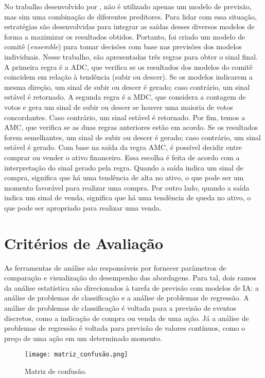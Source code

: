 No trabalho desenvolvido por , não é utilizado apenas um modelo de previsão, mas sim uma combinação de diferentes preditores. Para lidar com essa situação, estratégias são desenvolvidas para integrar as saídas desses diversos modelos de forma a maximizar os resultados obtidos. Portanto, foi criado um modelo de comitê (\textit{ensemble}) para tomar decisões com base nas previsões dos modelos individuais. Nesse trabalho, são apresentadas três regras para obter o sinal final. A primeira regra é a \ac{ADC}, que verifica se os resultados dos modelos do comitê coincidem em relação à tendência (subir ou descer). Se os modelos indicarem a mesma direção, um sinal de subir ou descer é gerado; caso contrário, um sinal estável é retornado. A segunda regra é a \ac{MDC}, que considera a contagem de votos e gera um sinal de subir ou descer se houver uma maioria de votos concordantes. Caso contrário, um sinal estável é retornado. Por fim, temos a \ac{AMC}, que verifica se as duas regras anteriores estão em acordo. Se os resultados forem semelhantes, um sinal de subir ou descer é gerado; caso contrário, um sinal estável é gerado. Com base na saída da regra \ac{AMC}, é possível decidir entre comprar ou vender o ativo financeiro. Essa escolha é feita de acordo com a interpretação do sinal gerado pela regra. Quando a saída indica um sinal de compra, significa que há uma tendência de alta no ativo, o que pode ser um momento favorável para realizar uma compra. Por outro lado, quando a saída indica um sinal de venda, significa que há uma tendência de queda no ativo, o que pode ser apropriado para realizar uma venda.


\section{Critérios de Avaliação}
\label{subsec:criterio_avaliacao}
As ferramentas de análise são responsáveis por fornecer parâmetros de comparação e visualização do desempenho das abordagens. Para tal, dois ramos da análise estatística são direcionados à tarefa de previsão com modelos de \ac{IA}: a análise de problemas de classificação e a análise de problemas de regressão. A análise de problemas de classificação é voltada para a previsão de eventos discretos, como a indicação de compra ou venda de uma ação. Já a análise de problemas de regressão é voltada para previsão de valores contínuos, como o preço de uma ação em um determinado momento.

\begin{figure}[htbp]
    \caption{Matriz de confusão.}
      \centering
      \texttt{[image: matriz\_confusão.png]} 
    \label{fig:matrizconfusao}
\end{figure}

